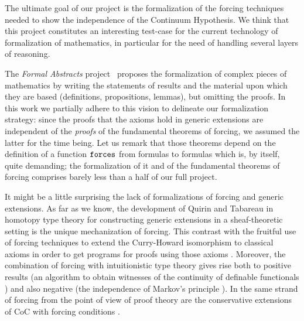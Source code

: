The
ultimate goal of our project is the formalization of the forcing
techniques needed to show the independence of the Continuum
Hypothesis. 
We think that this project constitutes an interesting test-case
for the current technology of formalization of mathematics, in
particular for the need of handling several layers of reasoning. 

The \emph{Formal Abstracts} project~\cite{hales-fabstracts} proposes
the formalization of complex pieces of mathematics by writing the
statements of 
results and the material upon which they are based (definitions,
propositions, lemmas), but omitting the proofs. In this work we
partially adhere to this vision to delineate our formalization
strategy: since the proofs that the  axioms hold in generic extensions
are independent of the \emph{proofs} of the fundamental theorems of
forcing, we assumed the latter for the time being. Let us remark
that those theorems depend on the definition of a function $\mathop{\mathtt{forces}}$
from formulas to formulas which is, by itself, quite demanding; the
formalization of it and of the fundamental theorems of forcing %
comprises barely less than a half of our full project.

It might be a little surprising the lack of formalizations of forcing
and generic extensions. As far as we know, the development of
Quirin and Tabareau \cite{JFR6232} in homotopy type theory for constructing generic
extensions in a sheaf-theoretic setting is the unique mechanization of
forcing. This contrast with the fruitful use of forcing techniques to
extend the Curry-Howard isomorphism to classical axioms in order to
get programs for proofs using those axioms
\cite{Miquel:2011:FPT:2058525.2059614,lmcs:1070}. Moreover, the
combination of forcing with intuitionistic type theory
\cite{Coquand:2009:FTT:1807662.1807665,coquand2010note} gives rise
both to positive results (an algorithm to obtain witnesses of the
continuity of definable functionals \cite{coquand2012computational})
and also negative (the independence of Markov's principle
\cite{lmcs:3859}). In the same strand of forcing from the point of
view of proof theory \cite{avigad_2004} are the conservative
extensions of CoC with forcing conditions
\cite{jaber:hal-01319066,Jaber:2012:ETT:2358958.2359524}.


